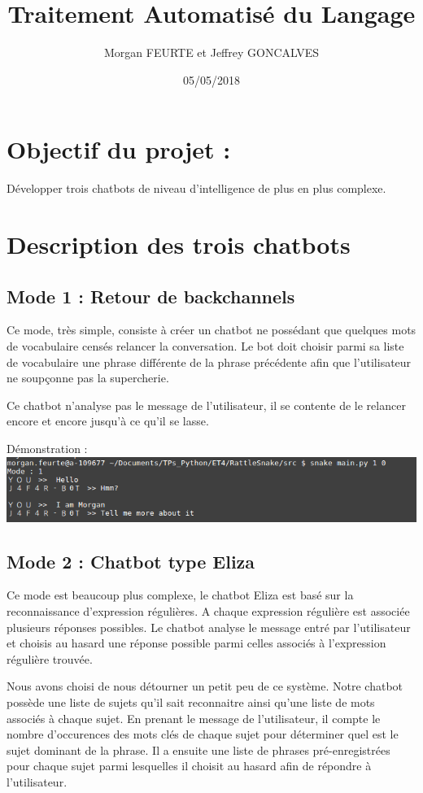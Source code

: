 \documentclass[paper=a4, fontsize=11pt]{article}
\begin{document}
\title{Traitement Automatisé du Langage}
\author{Morgan FEURTE et Jeffrey GONCALVES}
\date{05/05/2018}
\maketitle

\section{Objectif du projet :}
Développer trois chatbots de niveau d'intelligence de plus en plus complexe.

\section{Description des trois chatbots}
\subsection{Mode 1 : Retour de backchannels}
Ce mode, très simple, consiste à créer un chatbot ne possédant que quelques mots de vocabulaire censés relancer la conversation. Le bot doit choisir parmi sa liste de vocabulaire une phrase différente de la phrase précédente afin que l'utilisateur ne soupçonne pas la supercherie.

Ce chatbot n'analyse pas le message de l'utilisateur, il se contente de le relancer encore et encore jusqu'à ce qu'il se lasse.

Démonstration :
\includegraphics[width=736pt]{MeanBot_mode1.png}

\subsection{Mode 2 : Chatbot type Eliza}
Ce mode est beaucoup plus complexe, le chatbot Eliza est basé sur la reconnaissance d'expression régulières. A chaque expression régulière est associée plusieurs réponses possibles. Le chatbot analyse le message entré par l'utilisateur et choisis au hasard une réponse possible parmi celles associés à l'expression régulière trouvée.

Nous avons choisi de nous détourner un petit peu de ce système. Notre chatbot possède une liste de sujets qu'il sait reconnaitre ainsi qu'une liste de mots associés à chaque sujet. En prenant le message de l'utilisateur, il compte le nombre d'occurences des mots clés de chaque sujet pour déterminer quel est le sujet dominant de la phrase. Il a ensuite une liste de phrases pré-enregistrées pour chaque sujet parmi lesquelles il choisit au hasard afin de répondre à l'utilisateur. 
\end{document}
